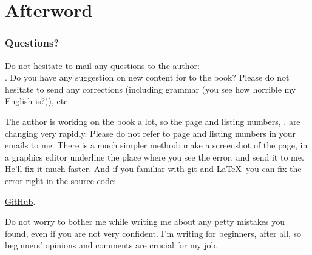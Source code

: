 \part*{Afterword}

\section{Questions?}

Do not hesitate to mail any questions to the author: \\
\GTT{<\EMAIL>}.
Do you have any suggestion on new content for to the book?
Please do not hesitate to send any corrections (including grammar (you see how horrible my English is?)), etc.

The author is working on the book a lot, so the page and listing numbers, \etc. are changing very rapidly.
Please do not refer to page and listing numbers in your emails to me.
There is a much simpler method: make a screenshot of the page, in a graphics editor underline the place where you see the error,
and send it to me. He'll fix it much faster.
And if you familiar with git and \LaTeX\, you can fix the error right in the source code:

\href{http://go.yurichev.com/17089}{GitHub}.

Do not worry to bother me while writing me about any petty mistakes you found, even if you are not very confident.
I'm writing for beginners, after all, so beginners' opinions and comments are crucial for my job.

